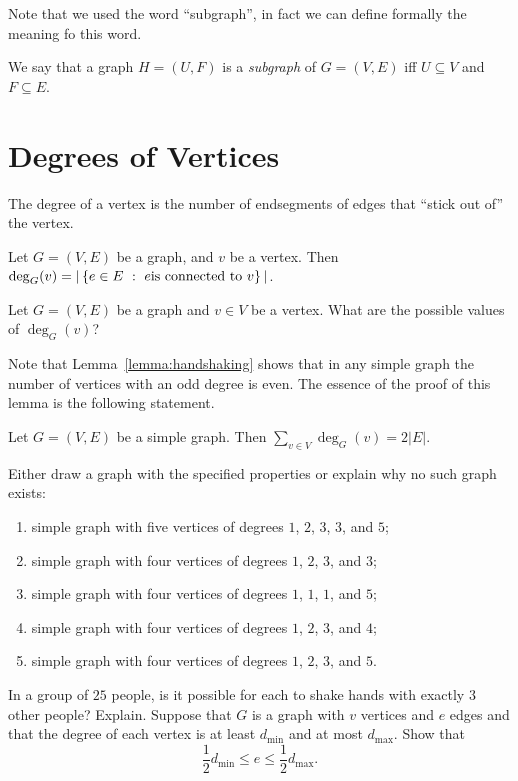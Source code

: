 Note that we used the word ``subgraph'', in fact we can define formally the
meaning fo this word.
\begin{definition}
  We say that a graph $H = (U, F)$ is a \emph{subgraph} of $G = (V, E)$ iff
  $U \subseteq V$ and $F \subseteq E$.
\end{definition}

\section{Degrees of Vertices}
The degree of a vertex is the number of endsegments of edges that ``stick out
of'' the vertex.
\begin{definition}
  Let $G = (V, E)$ be a graph, and $v$ be a vertex. Then
  $\deg_G(v) = |\set[{e \text{is connected to } v}]{e \in E}|$.
\end{definition}

\begin{exercise}
  Let $G = (V, E)$ be a graph and $v \in V$ be a vertex.
  What are the possible values of $\deg_G(v)$?
\end{exercise}

Note that Lemma~\ref{lemma:handshaking} shows that in any simple graph the
number of vertices with an odd degree is even.
The essence of the proof of this lemma is the following statement.
\begin{theorem}
  Let $G = (V, E)$ be a simple graph. Then $\sum_{v \in V} \deg_G(v) = 2|E|$.
\end{theorem}

\begin{chapterendexercises}
  \exercise Either draw a graph with the specified properties or explain why
    no such graph exists:
    \begin{enumerate}[nolistsep]
      \item simple graph with five vertices of degrees $1$, $2$, $3$, $3$,
        and $5$;
      \item simple graph with four vertices of degrees $1$, $2$, $3$, and $3$;
      \item simple graph with four vertices of degrees $1$, $1$, $1$, and $5$;
      \item simple graph with four vertices of degrees $1$, $2$, $3$, and $4$;
      \item simple graph with four vertices of degrees $1$, $2$, $3$, and $5$.
    \end{enumerate}
  \exercise In a group of $25$ people, is it possible for each to shake hands
    with exactly $3$ other people? Explain.
  \exercise Suppose that $G$ is a graph with $v$ vertices and $e$ edges and
    that the degree of each vertex is at least $d_\mathrm{min}$ and at most
    $d_\mathrm{max}$. Show that
    \[
      \frac{1}{2} d_\mathrm{min} \le e \le \frac{1}{2} d_\mathrm{max}.
    \]
\end{chapterendexercises}
